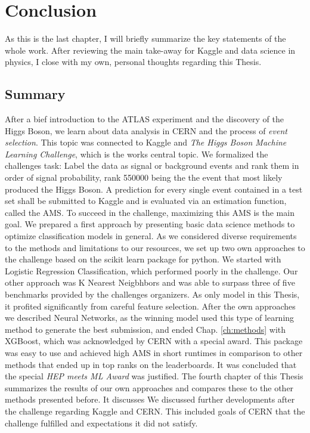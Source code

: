 \section{Conclusion}\label{ch:conc}
As this is the last chapter, I will briefly summarize the key statements of the whole work.
After reviewing the main take-away for Kaggle and data science in physics, I close with my own, personal thoughts regarding this Thesis.

\subsection{Summary}
After a bief introduction to the ATLAS experiment and the discovery of the Higgs Boson, we learn about data analysis in CERN and the process of \emph{event selection}. This topic was connected to Kaggle and \emph{The Higgs Boson Machine Learning Challenge}, which is the works central topic.
We formalized the challenges task: Label the data as signal or background events and rank them in order of signal probability, rank 550000 being the the event that most likely produced the Higgs Boson. A prediction for every single event contained in a test set shall be submitted to Kaggle and is evaluated via an estimation function, called the AMS. To succeed in the challenge, maximizing this AMS is the main goal.
We prepared a first approach by presenting basic data science methods to optimize classification models in general. As we considered diverse requirements to the methods and limitations to our resources, we set up two own approaches to the challenge based on the scikit learn package for python. We started with Logistic Regression Classification, which performed poorly in the challenge. Our other approach was K Nearest Neigbhbors and was able to surpass three of five benchmarks provided by the challenges organizers. As only model in this Thesis, it profited significantly from careful feature selection.
After the own approaches we described Neural Networks, as the winning model used this type of learning method to generate the best submission, and ended Chap. \ref{ch:methods} with XGBoost, which was acknowledged by CERN with a special award. This package was easy to use and achieved high AMS in short runtimes in comparison to other methods that ended up in top ranks on the leaderboards. It was concluded that the special \emph{HEP meets ML Award} was justified.
The fourth chapter of this Thesis summarizes the results of our own approaches and compares these to the other methods presented before. It discusses 
We discussed further developments after the challenge regarding Kaggle and CERN. This included goals of CERN that the challenge fulfilled and expectations it did not satisfy.

